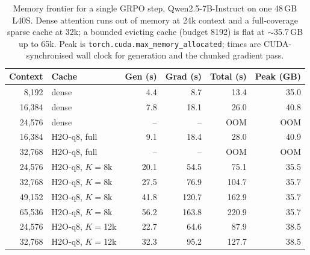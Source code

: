 \begin{table}[t]
  \caption{Memory frontier for a single GRPO step, Qwen2.5-7B-Instruct on one
  48\,GB L40S. Dense attention runs out of memory at 24k context and a
  full-coverage sparse cache at 32k; a bounded evicting cache (budget 8192)
  is flat at $\sim$35.7\,GB up to 65k. Peak is
  \texttt{torch.cuda.max\_memory\_allocated}; times are CUDA-synchronised
  wall clock for generation and the chunked gradient pass.}
  \label{tab:memory_frontier}
  \centering\scriptsize
  \setlength{\tabcolsep}{3pt}
  \begin{tabular}{rlrrrr}
    \toprule
    Context & Cache & Gen (s) & Grad (s) & Total (s) & Peak (GB) \\
    \midrule
    8{,}192  & dense              & 4.4  & 8.7   & 13.4  & 35.0 \\
    16{,}384 & dense              & 7.8  & 18.1  & 26.0  & 40.8 \\
    24{,}576 & dense              & --   & --    & OOM   & OOM \\
    \midrule
    16{,}384 & H2O-q8, full & 9.1  & 18.4  & 28.0  & 40.9 \\
    32{,}768 & H2O-q8, full & --   & --    & OOM   & OOM \\
    \midrule
    24{,}576 & H2O-q8, $K{=}$8k  & 20.1 & 54.5  & 75.1  & 35.5 \\
    32{,}768 & H2O-q8, $K{=}$8k  & 27.5 & 76.9  & 104.7 & 35.7 \\
    49{,}152 & H2O-q8, $K{=}$8k  & 41.8 & 120.7 & 162.9 & 35.7 \\
    65{,}536 & H2O-q8, $K{=}$8k  & 56.2 & 163.8 & 220.9 & 35.7 \\
    \midrule
    24{,}576 & H2O-q8, $K{=}$12k & 22.7 & 64.6  & 87.9  & 38.5 \\
    32{,}768 & H2O-q8, $K{=}$12k & 32.3 & 95.2  & 127.7 & 38.5 \\
    \bottomrule
  \end{tabular}
\end{table}
